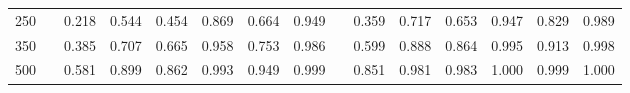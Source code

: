 % 
\begin{tabular}{ccccccccccccccc}
  \hline
  \hline
250 &  & 0.218 & 0.544 & 0.454 & 0.869 & 0.664 & 0.949 &  & 0.359 & 0.717 & 0.653 & 0.947 & 0.829 & 0.989 \\ 
  350 &  & 0.385 & 0.707 & 0.665 & 0.958 & 0.753 & 0.986 &  & 0.599 & 0.888 & 0.864 & 0.995 & 0.913 & 0.998 \\ 
  500 &  & 0.581 & 0.899 & 0.862 & 0.993 & 0.949 & 0.999 &  & 0.851 & 0.981 & 0.983 & 1.000 & 0.999 & 1.000 \\ 
   \hline
\end{tabular}
